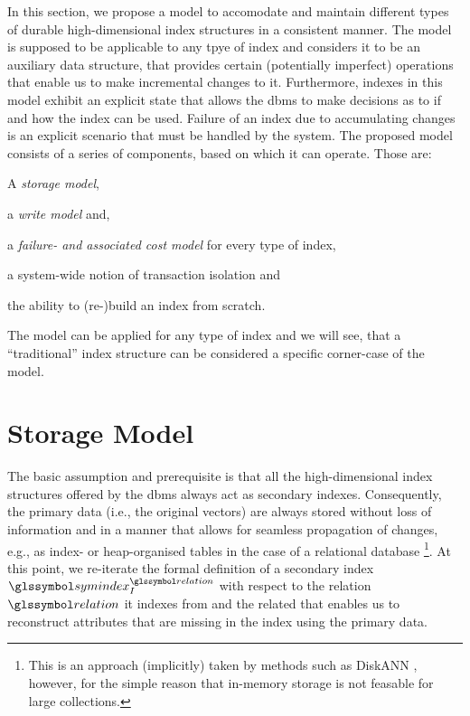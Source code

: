 In this section, we propose a model to accomodate and maintain different types of durable high-dimensional index structures in a consistent manner. The model is supposed to be applicable to any tpye of index and considers it to be an auxiliary data structure, that provides certain (potentially imperfect) operations that enable us to make incremental changes to it. Furthermore, indexes in this model exhibit an explicit state that allows the \acrshort{dbms} to make decisions as to if and how the index can be used. Failure of an index due to accumulating changes is an explicit scenario that must be handled by the system. The proposed model consists of a series of components, based on which it can operate. Those are:
\begin{enumerate*}[label=(\roman*)]
    \item A \emph{storage model},
    \item a \emph{write model} and,
    \item a \emph{failure- and associated cost model} for every type of index,
    \item a system-wide notion of transaction isolation and
    \item the ability to (re-)build an index from scratch.
\end{enumerate*} 
The model can be applied for any type of index and we will see, that a ``traditional'' index structure can be considered a specific corner-case of the model.

\section{Storage Model}

The basic assumption and prerequisite is that all the high-dimensional index structures offered by the \acrshort{dbms} always act as secondary indexes. Consequently, the primary data (i.e., the original vectors) are always stored without loss of information and in a manner that allows for seamless propagation of changes, e.g., as index- or heap-organised tables in the case of a relational database \footnote{This is an approach (implicitly) taken by methods such as DiskANN \cite{Jayaram:2019DiskANN}, however, for the simple reason that in-memory storage is not feasable for large collections.}. At this point, we re-iterate the formal definition of a secondary index $\symindex^{\relation}_I$ with respect to the relation $\relation$ it indexes from  and the related  that enables us to reconstruct attributes that are missing in the index using the primary data.

